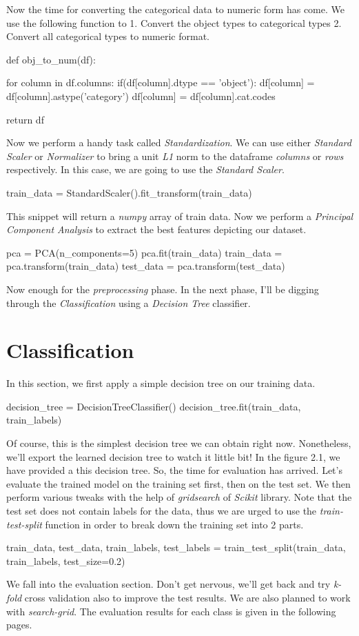 \documentclass[12pt]{article}
\numberwithin{equation}{section}
\numberwithin{table}{section}
\numberwithin{figure}{section}
\begin{document}
Now the time for converting the categorical data to numeric form has come. We use the following function to 1. Convert the object types to categorical types 2. Convert all categorical types to numeric format.
\begin{python}
	def obj_to_num(df):
	
	for column in df.columns:
		if(df[column].dtype == 'object'):
			df[column] = df[column].astype('category')
			df[column] = df[column].cat.codes
	
	return df
\end{python} 
Now we perform a handy task called \textit{Standardization}. We can use either \textit{Standard Scaler} or \textit{Normalizer} to bring a unit \textit{L1} norm to the dataframe \textit{columns} or \textit{rows} respectively. In this case, we are going to use the \textit{Standard Scaler}.
\begin{python}
	train_data = StandardScaler().fit_transform(train_data)
\end{python}
This snippet will return a \textit{numpy} array of train data. Now we perform a \textit{Principal Component Analysis} to extract the best features depicting our dataset.
\begin{python}
	pca = PCA(n_components=5)
	pca.fit(train_data)
	train_data = pca.transform(train_data)
	test_data = pca.transform(test_data)
\end{python}
Now enough for the \textit{preprocessing} phase. In the next phase, I'll be digging through the \textit{Classification} using a \textit{Decision Tree} classifier.

\section{Classification}
In this section, we first apply a simple decision tree on our training data.
\begin{python}
	decision_tree = DecisionTreeClassifier()
	decision_tree.fit(train_data, train_labels)
\end{python}
Of course, this is the simplest decision tree we can obtain right now. Nonetheless, we'll export the learned decision tree to watch it little bit! In the figure 2.1, we have provided a this decision tree. So, the time for evaluation has arrived. Let's evaluate the trained model on the training set first, then on the test set. We then perform various tweaks with the help of \textit{gridsearch} of \textit{Scikit} library. Note that the test set does not contain labels for the data, thus we are urged to use the \textit{train-test-split} function in order to break down the training set into 2 parts.
\begin{python}
	train_data, test_data, train_labels, test_labels =
	train_test_split(train_data, train_labels, test_size=0.2)
\end{python}
We fall into the evaluation section. Don't get nervous, we'll get back and try \textit{k-fold} cross validation also to improve the test results. We are also planned to work with \textit{search-grid}. The evaluation results for each class is given in the following pages.
\end{document}
